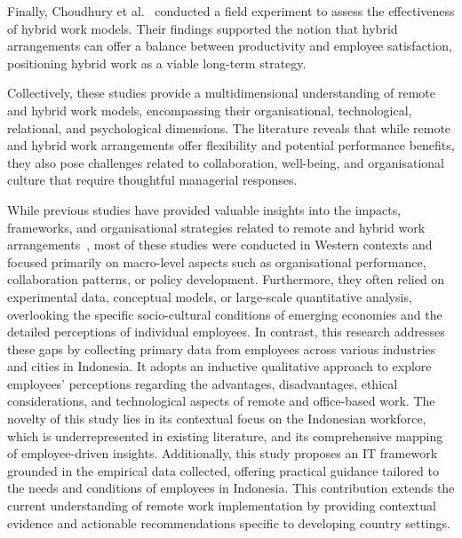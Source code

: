 \documentclass[a4paper, conference]{IEEEtran}
\begin{document}
Finally, Choudhury et al.~\cite{Choudhury2024Hybrid} conducted a field experiment to assess the effectiveness of hybrid work models. Their findings supported the notion that hybrid arrangements can offer a balance between productivity and employee satisfaction, positioning hybrid work as a viable long-term strategy.

Collectively, these studies provide a multidimensional understanding of remote and hybrid work models, encompassing their organisational, technological, relational, and psychological dimensions. The literature reveals that while remote and hybrid work arrangements offer flexibility and potential performance benefits, they also pose challenges related to collaboration, well-being, and organisational culture that require thoughtful managerial responses.

While previous studies have provided valuable insights into the impacts, frameworks, and organisational strategies related to remote and hybrid work arrangements~\cite{yang2022effects,Newbold2022NewNormals,munch2022capabilities,Leonardi2024RemoteWork,Raj2023Remote,Keppler2023RelationalConfidence,Smite2023WFHFlexibility,Fan2023SubjectiveWellbeing,Lauring2024Hybrid,Choudhury2024Hybrid}, most of these studies were conducted in Western contexts and focused primarily on macro-level aspects such as organisational performance, collaboration patterns, or policy development. Furthermore, they often relied on experimental data, conceptual models, or large-scale quantitative analysis, overlooking the specific socio-cultural conditions of emerging economies and the detailed perceptions of individual employees. In contrast, this research addresses these gaps by collecting primary data from employees across various industries and cities in Indonesia. It adopts an inductive qualitative approach to explore employees’ perceptions regarding the advantages, disadvantages, ethical considerations, and technological aspects of remote and office-based work. The novelty of this study lies in its contextual focus on the Indonesian workforce, which is underrepresented in existing literature, and its comprehensive mapping of employee-driven insights. Additionally, this study proposes an IT framework grounded in the empirical data collected, offering practical guidance tailored to the needs and conditions of employees in Indonesia. This contribution extends the current understanding of remote work implementation by providing contextual evidence and actionable recommendations specific to developing country settings.
\end{document}
